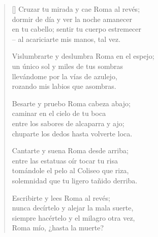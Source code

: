 \documentclass[a4paper,11pt]{article}
\begin{document}
\thispagestyle{empty}


\settowidth{\versewidth}{en tu cabello; sentir tu cuerpo estremecer}

\bigskip

\begin{verse}[\versewidth]
  Cruzar tu mirada y cae Roma al revés; \\
  dormir de día y ver la noche amanecer \\
  en tu cabello; sentir tu cuerpo estremecer \\
  -- al acariciarte mis manos, tal vez.

  Vislumbrarte y deslumbra Roma en el espejo; \\
  un único sol y miles de tus sombras \\
  llevándome por la vías de azulejo, \\
  rozando mis labios que asombras.

  Besarte y pruebo Roma cabeza abajo; \\
  caminar en el cielo de tu boca \\
  entre los sabores de alcaparra y ajo; \\
  chuparte los dedos hasta volverte loca.

  Cantarte y suena Roma desde arriba; \\
  entre las estatuas oír tocar tu risa \\
  tomándole el pelo al Coliseo que riza, \\
  solemnidad que tu ligero tañido derriba.

  Escribirte y lees Roma al revés; \\
  nunca decírtelo y alejar la mala suerte, \\
  siempre hacértelo y el milagro otra vez, \\
  Roma mío, ¿hasta la muerte?
\end{verse}

\end{document}
